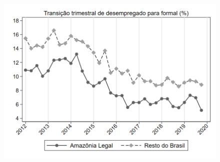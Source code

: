 \begin{frame}[label=_transicao_ocupacao_amazonia_legal_matriz]{}
\textit{\hyperlink{_transicao_ocupacao}{}}

\end{frame}

\begin{frame}[label=_transicao_ocupacao_resto_brasil_matriz]{}
\textit{\hyperlink{_transicao_ocupacao}{}}

\end{frame}

\begin{frame}[label=_transicao_ocupacao_matriz_diferenca]{}
\textit{\hyperlink{_transicao_ocupacao}{}}

\end{frame}


\begin{frame}[label=_transicao_ocupacao_sh_desempregado_sh_formal]{}
\textit{\hyperlink{_transicao_ocupacao}{}}
\begin{figure}
  \centering
  \includegraphics[width=1\linewidth]{../../analysis/output/transicao_ocupacao/_transicao_ocupacao_sh_desempregado_sh_formal.png}
  \caption{}
  \label{fig:_transicao_ocupacao_sh_desempregado_sh_formal}
\end{figure}
\end{frame}

